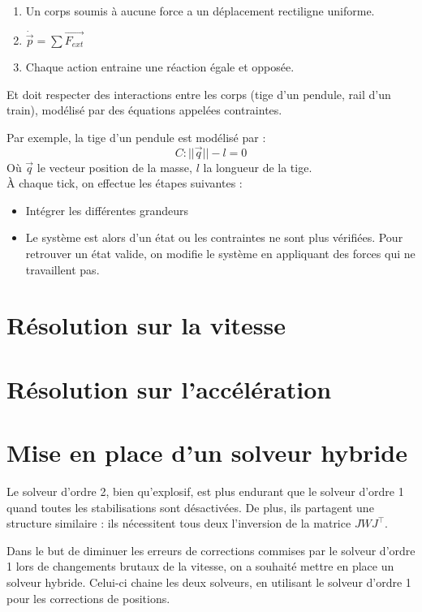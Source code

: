\documentclass[11pt, letterpaper]{report}
\begin{document}
    \begin{enumerate}
        \item Un corps soumis à aucune force a un déplacement rectiligne uniforme.
        \item $ \dot{\vec{p}} = \sum \vec{F_{ext}} $
        \item Chaque action entraine une réaction égale et opposée.
    \end{enumerate}

    Et doit respecter des interactions entre les corps (tige d'un pendule, rail d'un train), modélisé par des équations appelées contraintes.

    Par exemple, la tige d'un pendule est modélisé par :
    \[C : ||\vec{q}|| - l= 0 \]
    Où $\vec{q}$ le vecteur position de la masse, $l$ la longueur de la tige.
    \\
    À chaque tick, on effectue les étapes suivantes :
    \begin{itemize}
        \item Intégrer les différentes grandeurs
        \item Le système est alors d'un état ou les contraintes ne sont plus vérifiées.
        Pour retrouver un état valide, on modifie le système en appliquant des forces qui ne travaillent pas.
    \end{itemize}

    \section{Résolution sur la vitesse}\label{sec:resolution-premier-ordre}
    

    \section{Résolution sur l'accélération}\label{sec:resolution-second_ordre}
    

    \section{Mise en place d'un solveur hybride}\label{sec:hybride}
    Le solveur d'ordre 2, bien qu'explosif, est plus endurant que le solveur d'ordre 1 quand toutes les stabilisations sont désactivées.
    De plus, ils partagent une structure similaire : ils nécessitent tous deux l'inversion de la matrice $J W J^\intercal$.

    Dans le but de diminuer les erreurs de corrections commises par le solveur d'ordre 1 lors de changements brutaux de la vitesse,
    on a souhaité mettre en place un solveur hybride.
    Celui-ci chaine les deux solveurs, en utilisant le solveur d'ordre 1 pour les corrections de positions.
\end{document}
